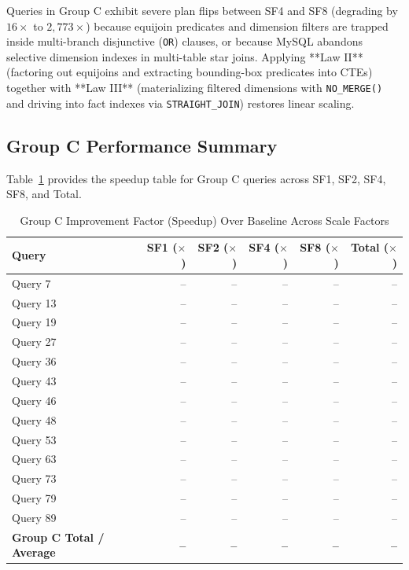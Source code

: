 \documentclass{ULBreport}
\begin{document}
Queries in Group C exhibit severe plan flips between SF4 and SF8 (degrading by $16\times$ to $2,773\times$) because equijoin predicates and dimension filters are trapped inside multi-branch disjunctive (\texttt{OR}) clauses, or because MySQL abandons selective dimension indexes in multi-table star joins. Applying **Law II** (factoring out equijoins and extracting bounding-box predicates into CTEs) together with **Law III** (materializing filtered dimensions with \texttt{NO\_MERGE()} and driving into fact indexes via \texttt{STRAIGHT\_JOIN}) restores linear scaling.

\subsection{Group C Performance Summary}
Table~\ref{tab:group_c_results} provides the speedup table for Group C queries across SF1, SF2, SF4, SF8, and Total.

\begin{table}[htbp]
\centering
\caption{Group C Improvement Factor (Speedup) Over Baseline Across Scale Factors}
\label{tab:group_c_results}
\begin{tabular}{@{}lrrrrr@{}}
\toprule
\textbf{Query} & \textbf{SF1 ($\times$)} & \textbf{SF2 ($\times$)} & \textbf{SF4 ($\times$)} & \textbf{SF8 ($\times$)} & \textbf{Total ($\times$)} \\ \midrule
Query 7  & -- & -- & -- & -- & -- \\
Query 13 & -- & -- & -- & -- & -- \\
Query 19 & -- & -- & -- & -- & -- \\
Query 27 & -- & -- & -- & -- & -- \\
Query 36 & -- & -- & -- & -- & -- \\
Query 43 & -- & -- & -- & -- & -- \\
Query 46 & -- & -- & -- & -- & -- \\
Query 48 & -- & -- & -- & -- & -- \\
Query 53 & -- & -- & -- & -- & -- \\
Query 63 & -- & -- & -- & -- & -- \\
Query 73 & -- & -- & -- & -- & -- \\
Query 79 & -- & -- & -- & -- & -- \\
Query 89 & -- & -- & -- & -- & -- \\ \midrule
\textbf{Group C Total / Average} & \textbf{--} & \textbf{--} & \textbf{--} & \textbf{--} & \textbf{--} \\ \bottomrule
\end{tabular}
\end{table}
\end{document}
